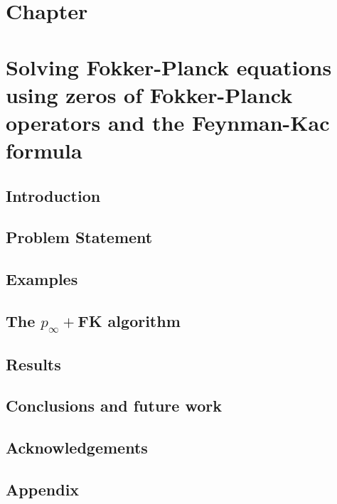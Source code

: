 \chapter*{Chapter }
\textit{}
\newpage

\chapter{Solving Fokker-Planck equations using zeros of Fokker-Planck operators and the Feynman-Kac formula}
\section{Introduction}
\label{sec-intro--dynamic-fp}


\section{Problem Statement}
\label{sec-prob--dynamic-fp}


\section{Examples}
\label{sec-example--dynamic-fp}


\section{The \texorpdfstring{$p_\infty+$}{Lg}FK algorithm}
\label{sec-algo--dynamic-fp}



\section{Results}
\label{sec-results--dynamic-fp}



\section{Conclusions and future work}
\label{sec-conclusions--dynamic-fp}


\section*{Acknowledgements}


\section{Appendix}
\label{sec-appendix--dynamic-fp}





